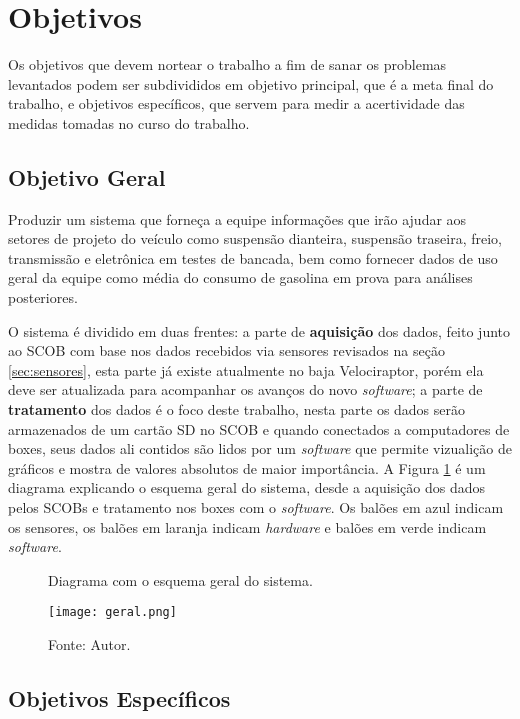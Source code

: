 \section{Objetivos}
\label{sec:objetivos}
Os objetivos que devem nortear o trabalho a fim de sanar os problemas levantados podem ser subdivididos em objetivo principal, que é a meta final do trabalho, e objetivos específicos, que servem para medir a acertividade das medidas tomadas no curso do trabalho.

\subsection{Objetivo Geral}

Produzir um sistema que forneça a equipe informações que irão ajudar aos setores de projeto do veículo como suspensão dianteira, suspensão traseira, freio, transmissão e eletrônica em testes de bancada, bem como fornecer dados de uso geral da equipe como média do consumo de gasolina em prova para análises posteriores. 

O sistema é dividido em duas frentes: a parte de \textbf{aquisição} dos dados, feito junto ao SCOB com base nos dados recebidos via sensores revisados na seção \ref{sec:sensores}, esta parte já existe atualmente no baja Velociraptor, porém ela deve ser atualizada para acompanhar os avanços do novo \textit{software}; a parte de \textbf{tratamento} dos dados é o foco deste trabalho, nesta parte os dados serão armazenados de um cartão SD no SCOB e quando conectados a computadores de boxes, seus dados ali contidos são lidos por um \textit{software} que permite vizualição de gráficos e mostra de valores absolutos de maior importância. A Figura \ref{fig:geral} é um diagrama explicando o esquema geral do sistema, desde a aquisição dos dados pelos SCOBs e tratamento nos boxes com o \textit{software}. Os balões em azul indicam os sensores, os balões em laranja indicam \textit{hardware} e balões em verde indicam \textit{software}.         

\begin{figure}[!htb]
	\centering
		\caption{Diagrama com o esquema geral do sistema.}
		\texttt{[image: geral.png]} 
		\caption*{Fonte: Autor.}
		\label{fig:geral}
\end{figure} 


\subsection{Objetivos Específicos} 


